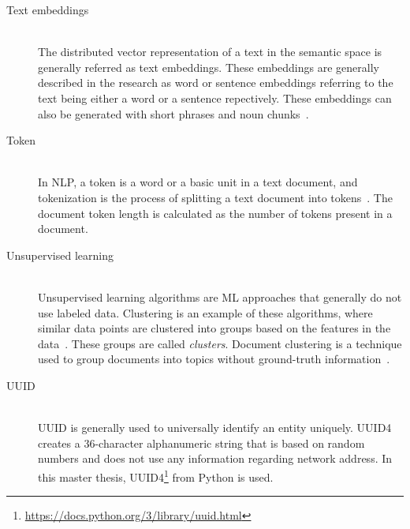 \begin{description}
				
				\item[Text embeddings] \hfill \\ The distributed vector representation of a text
				in the semantic space is generally referred as text embeddings. These embeddings are generally described in the research as word or sentence embeddings referring to the text being either a word or a sentence repectively. These embeddings can
				also be generated with short phrases and noun chunks~\cite{cer2018universal, yang2019multilingual}.
				
				\item[Token] \hfill \\ In \ac{NLP}, a token is a word or a basic unit in a text document, and tokenization is the process of splitting a text document into tokens~\cite{webster1992tokenization}. The document token length is calculated as the number of tokens present in a document.
	
		
	
		
	\item[Unsupervised learning] \hfill \\ Unsupervised learning algorithms are \ac{ML} approaches that generally do not use labeled data. Clustering is an example of these algorithms, where similar data points are clustered into groups based on the features in the data~\cite{mahesh2020machine}. These groups are called \emph{clusters}. Document clustering is a technique used to group documents into topics without ground-truth information~\cite{de2012document}.
	
	
	
	
	

	

	\item[UUID] \hfill \\ 	
	
	\ac{UUID} is generally used to universally identify an entity uniquely. UUID4 creates a 36-character alphanumeric string that is based on random numbers and does not use any information regarding network address. In this master thesis, UUID4\footnote{\url{https://docs.python.org/3/library/uuid.html}} from Python is used.
	


\end{description}
